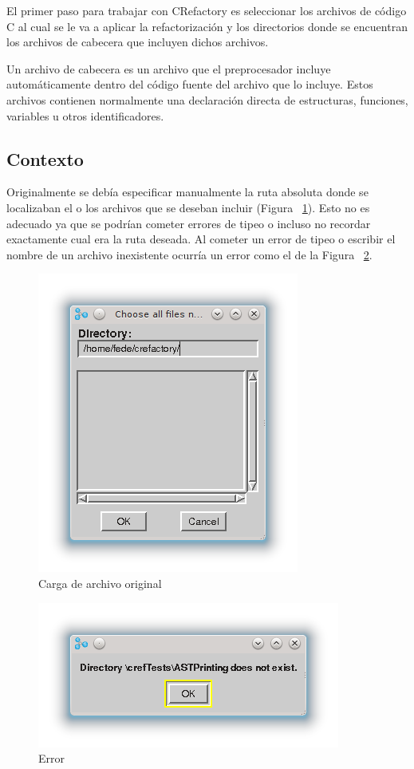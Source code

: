 \documentclass[a4paper,oneside,12pt]{article}
\begin{document}
El primer paso para trabajar con CRefactory es seleccionar los archivos de c\'odigo C al cual se le va a aplicar la refactorizaci\'on y los directorios donde se encuentran los archivos de cabecera que incluyen dichos archivos.

Un archivo de cabecera es un archivo que el preprocesador incluye autom\'aticamente dentro del c\'odigo fuente del archivo que lo incluye. Estos archivos contienen normalmente una declaraci\'on directa de estructuras, funciones, variables u otros identificadores.


\subsection{Contexto}
Originalmente se deb\'ia especificar manualmente la ruta absoluta donde se localizaban el o los archivos que se deseban incluir (Figura ~\ref{carga_original}). Esto no es adecuado ya que se podr\'ian cometer errores de tipeo o incluso no recordar exactamente cual era la ruta deseada.
Al cometer un error de tipeo o escribir el nombre de un archivo inexistente ocurr\'ia un error como el de la Figura ~\ref{error}.

\begin{figure}[h!]
  \centering
    \includegraphics[scale=0.85]{images/codigo_original/carga.png}
    \caption{Carga de archivo original}
    \label{carga_original}
\end{figure}

\begin{figure}[h!]
  \centering
    \includegraphics[scale=0.85]{images/codigo_original/error.png}
    \caption{Error}
    \label{error}
\end{figure}
\end{document}
